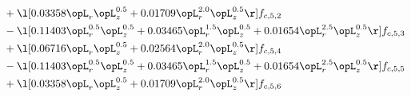 \begin{alignat}{2}
& + \l[  0.03358 \opL_r \opL_z^{0.5} +  0.01709 \opL_r^{2.0} \opL_z^{0.5}  \r] f_{c,5,2} \nonumber \\ 
& - \l[  0.11403 \opL_r^{0.5} \opL_z^{0.5} +  0.03465 \opL_r^{1.5} \opL_z^{0.5} +  0.01654 \opL_r^{2.5} \opL_z^{0.5}  \r] f_{c,5,3} \nonumber \\ 
& + \l[  0.06716 \opL_r \opL_z^{0.5} +  0.02564 \opL_r^{2.0} \opL_z^{0.5}  \r] f_{c,5,4} \nonumber \\ 
& - \l[  0.11403 \opL_r^{0.5} \opL_z^{0.5} +  0.03465 \opL_r^{1.5} \opL_z^{0.5} +  0.01654 \opL_r^{2.5} \opL_z^{0.5}  \r] f_{c,5,5} \nonumber \\ 
& + \l[  0.03358 \opL_r \opL_z^{0.5} +  0.01709 \opL_r^{2.0} \opL_z^{0.5}  \r] f_{c,5,6} \nonumber \\ 
\end{alignat} 


